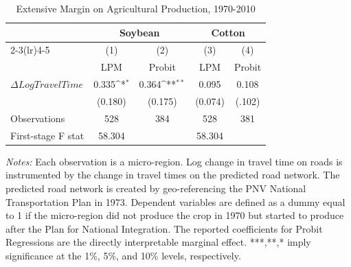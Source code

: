 \begin{table}[htbp]\centering
\def\sym#1{\ifmmode^{#1}\else\(^{#1}\)\fi}
\begingroup
\renewcommand{\arraystretch}{1.3}
\caption{Extensive Margin on Agricultural Production, 1970-2010}
\begin{tabular}{l*{4}{c}}
\hline\hline
                    &\multicolumn{2}{c}{Soybean}                &\multicolumn{2}{c}{Cotton}                 \\\cmidrule(lr){2-3}\cmidrule(lr){4-5}
                    &\multicolumn{1}{c}{(1)}         &\multicolumn{1}{c}{(2)}         &\multicolumn{1}{c}{(3)}         &\multicolumn{1}{c}{(4)}         \\
                    &         LPM         &      Probit         &         LPM         &      Probit         \\
\hline              
$\Delta Log Travel Time$&       0.335\sym{*}  &   0.364\sym{**} &       0.095         &       0.108         \\
                    &     (0.180)         &     (0.175)         &     (0.074)         &     (.102)         \\
\hline
Observations        &         528         &         384         &         528         &         381         \\
First-stage F stat  &      58.304         &                     &      58.304         &                     \\
\hline\hline
\end{tabular}
\endgroup
\begin{minipage}{11cm}
    \vspace{0.1cm}
    {\footnotesize \textit{Notes: }  Each observation is a micro-region. Log change in travel time on roads is instrumented by the change in travel times on the predicted road network. The predicted road network is created by geo-referencing the PNV National Transportation Plan in 1973. Dependent variables are defined as a dummy equal to 1 if the micro-region did not produce the crop in 1970 but started to produce after the Plan for National Integration. The reported coefficients for Probit Regressions are the directly interpretable marginal effect. ***,**,* imply significance at the 1\%, 5\%, and 10\% levels, respectively.}
\end{minipage}
\end{table}
